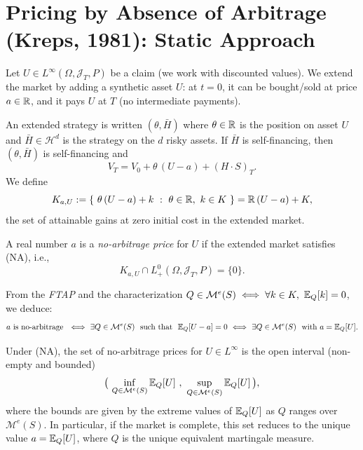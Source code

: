 \section{Pricing by Absence of Arbitrage (Kreps, 1981): Static Approach}

Let $U\in L^\infty(\Omega,\mathcal{J}_T,P)$ be a claim (we work with discounted values).  
We extend the market by adding a synthetic asset $U$: at $t=0$, it can be bought/sold at price $a\in\mathbb{R}$, and it pays $U$ at $T$ (no intermediate payments).

An extended strategy is written $(\theta,\bar H)$ where $\theta\in\mathbb{R}$ is the position on asset $U$ and $\bar H\in\mathcal{H}^{d}$ is the strategy on the $d$ risky assets.  
If $\bar H$ is self-financing, then $(\theta,\bar H)$ is self-financing and
\begin{equation}
V_T = V_0 + \theta\,(U-a) + (H\cdot S)_T.
\end{equation}
We define
\begin{equation}
K_{a,U} := \{\ \theta\,(U-a) + k \ :\ \theta\in\mathbb{R},\ k\in K\ \}
= \mathbb{R}\,(U-a)+K,
\end{equation}
the set of attainable gains at zero initial cost in the extended market.

\begin{definition}
A real number $a$ is a \emph{no-arbitrage price} for $U$ if the extended market satisfies (NA), i.e.,
\begin{equation}
K_{a,U}\cap L_+^0(\Omega,\mathcal{J}_T,P)=\{0\}.
\end{equation}
\end{definition}

\begin{remark}
From the \emph{FTAP} and the characterization $Q\in\mathcal{M}^e(S)\iff \forall k\in K,\ \E_Q[k]=0$, we deduce:
\[
a \text{ is no-arbitrage } \ \Longleftrightarrow\ \exists Q\in\mathcal{M}^e(S)\ \text{ such that }\ \E_Q[U-a]=0
\ \Longleftrightarrow\ \exists Q\in\mathcal{M}^e(S)\ \text{ with } a=\E_Q[U].
\]
\end{remark}

\begin{theorem}
\label{thm:intervalle_prix_NA}
Under (NA), the set of no-arbitrage prices for $U\in L^\infty$ is the open interval (non-empty and bounded)
\begin{equation}
\big(\, \inf_{Q\in\mathcal{M}^e(S)} \E_Q[U]\ ,\ \sup_{Q\in\mathcal{M}^e(S)} \E_Q[U] \,\big),
\end{equation}
where the bounds are given by the extreme values of $\mathbb{E}_Q[U]$ as $Q$ ranges over $\mathcal{M}^e(S)$.
In particular, if the market is complete, this set reduces to the unique value $a=\mathbb{E}_Q[U]$, where $Q$ is the unique equivalent martingale measure.
\end{theorem}

